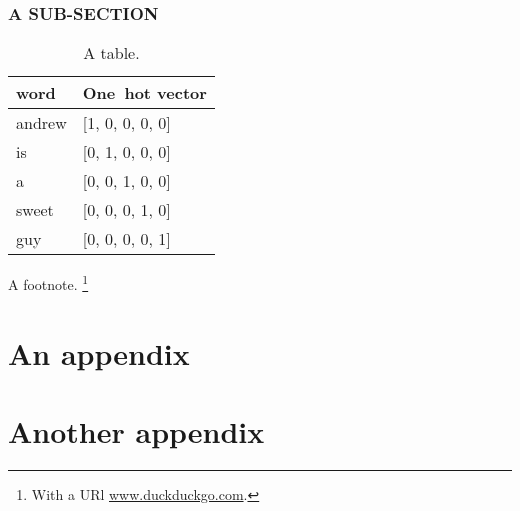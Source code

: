 \documentclass[12pt]{book}
\renewcommand{\&}{\textup{\symbol{`\&}}}
\begin{document}
\subsection{A SUB-SECTION}
\label{sub:sub}

\begin{table}[t]
\centering
  \begin{tabular}{p{3cm}p{3cm}} 
 \hline
 word & One\ hot vector\\
 \hline
 andrew & [1, 0, 0, 0, 0] \\ 
 is & [0, 1, 0, 0, 0] \\

 a & [0, 0, 1, 0, 0] \\

 sweet & [0, 0, 0, 1, 0]\\

 guy & [0, 0, 0, 0, 1]\\ 
 \hline
\end{tabular}
\caption{A table.}
\label{tab:wordnvec}
\end{table}

A footnote.%
\footnote{With a URl \url{www.duckduckgo.com}.}







\appendix

\chapter{An appendix}

\chapter{Another appendix}
\end{document}
